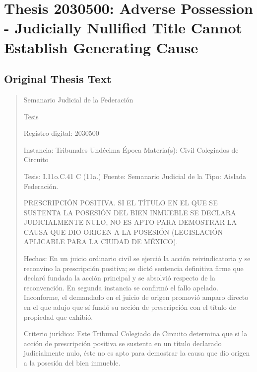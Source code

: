 \documentclass[11pt,a4paper]{article}
\begin{document}
\newpage

\section{Thesis 2030500: Adverse Possession - Judicially Nullified Title Cannot Establish Generating Cause}
\label{thesis:2030500}

\subsection{Original Thesis Text}

\begin{quote}
                                                   Semanario Judicial de la Federación

                                                Tesis

 Registro digital: 2030500

 Instancia: Tribunales             Undécima Época                         Materia(s): Civil
 Colegiados de Circuito

 Tesis: I.11o.C.41 C (11a.)        Fuente: Semanario Judicial de la       Tipo: Aislada
                                   Federación.


PRESCRIPCIÓN POSITIVA. SI EL TÍTULO EN EL QUE SE SUSTENTA LA POSESIÓN DEL BIEN
INMUEBLE SE DECLARA JUDICIALMENTE NULO, NO ES APTO PARA DEMOSTRAR LA CAUSA
QUE DIO ORIGEN A LA POSESIÓN (LEGISLACIÓN APLICABLE PARA LA CIUDAD DE MÉXICO).


Hechos: En un juicio ordinario civil se ejerció la acción reivindicatoria y se reconvino la prescripción
positiva; se dictó sentencia definitiva firme que declaró fundada la acción principal y se absolvió
respecto de la reconvención. En segunda instancia se confirmó el fallo apelado. Inconforme, el
demandado en el juicio de origen promovió amparo directo en el que adujo que sí fundó su acción
de prescripción con el título de propiedad que exhibió.

Criterio jurídico: Este Tribunal Colegiado de Circuito determina que si la acción de prescripción
positiva se sustenta en un título declarado judicialmente nulo, éste no es apto para demostrar la
causa que dio origen a la posesión del bien inmueble.


\end{quote}
\end{document}

